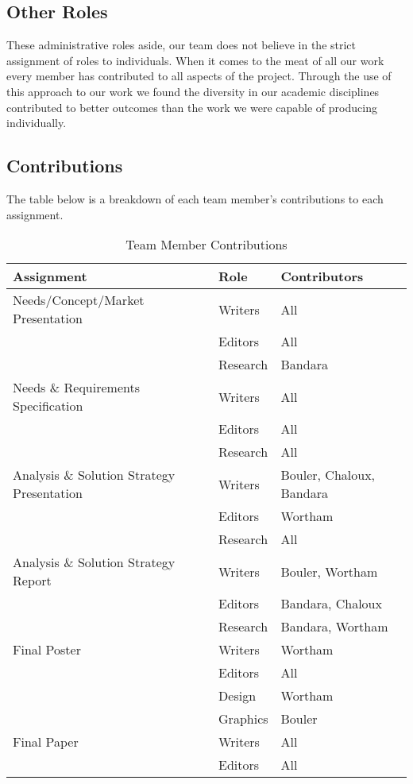 \documentclass[12pt,letterpaper]{article}
\begin{document}
\subsection{Other Roles}
These administrative roles aside, our team does not
believe in the strict assignment of roles to individuals.  When it comes to the
meat of all our work every member has contributed to all aspects of the project.
Through the use of this approach to our work we found the diversity in our
academic disciplines contributed to better outcomes than the work we were
capable of producing individually. 


\clearpage
\subsection{Contributions}
The table below is a breakdown of each team member's contributions to each assignment.

\begin{table}[h!]
\begin{center}
\begin{tabular}{|l|l|l|}
\hline
\textbf{Assignment} & \textbf{Role} & \textbf{Contributors} \\
\hline

Needs/Concept/Market Presentation & Writers & All \\
\cline{2-3}
& Editors  & All \\
\cline{2-3}
& Research  & Bandara \\
\hline

Needs \& Requirements Specification & Writers & All \\
\cline{2-3}
& Editors  & All \\
\cline{2-3}
& Research  & All \\
\hline

Analysis \& Solution Strategy Presentation & Writers & Bouler, Chaloux, Bandara \\
\cline{2-3}
& Editors  & Wortham \\
\cline{2-3}
& Research  & All \\
\hline

Analysis \& Solution Strategy Report & Writers & Bouler, Wortham \\
\cline{2-3}
& Editors  & Bandara, Chaloux \\
\cline{2-3}
& Research  & Bandara, Wortham \\
\hline

Final Poster & Writers & Wortham \\
\cline{2-3}
& Editors  & All \\
\cline{2-3}
& Design	& Wortham \\
\cline{2-3}
& Graphics	& Bouler \\
\hline

Final Paper & Writers & All \\
\cline{2-3}
& Editors  & All \\
\hline
\end{tabular}
\caption{Team Member Contributions}
\end{center}
\end{table}
\end{document}

